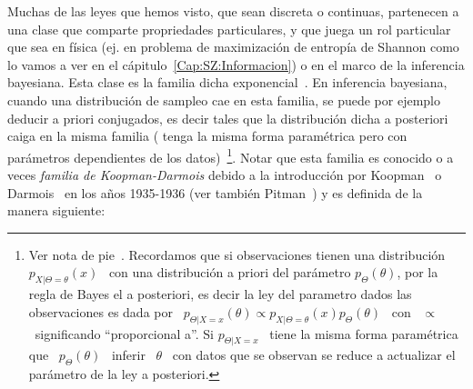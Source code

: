 \label{Ssec:MP:FamiliaExponencial}




Muchas de las leyes que hemos visto, que sean discreta o continuas, partenecen a
una clase que comparte propriedades  particulares, y que juega un rol particular
que sea en f\'isica (ej. en  problema de maximizaci\'on de entrop\'ia de Shannon
como lo vamos a ver en  el c\'apitulo~\ref{Cap:SZ:Informacion}) o en el marco de
la inferencia bayesiana. Esta clase es la familia dicha exponencial~\cite{Dar35,
  Koo36, And70, LehCas98, IbPer12,  Muk00, KotBal00, Rob07, Bos07, Cen82, Kay93,
  NieNoc10}.  En inferencia bayesiana,  cuando una distribuci\'on de sampleo cae
en esta  familia, se  puede por  ejemplo deducir a  priori conjugados,  es decir
tales que  la distribuci\'on dicha a  posteriori caiga en la  misma familia (\ie
tenga la  misma forma  param\'etrica pero con  par\'ametros dependientes  de los
datos)~\footnote{Ver nota de pie~. Recordamos que si
  observaciones tienen  una distribuci\'on \ $p_{X|\Theta=\theta}(x)$  \ con una
  distribuci\'on a  priori del par\'ametro  $p_\Theta(\theta)$, por la  regla de
  Bayes el a  posteriori, es decir la ley del  parametro dados las observaciones
  es   dada  por   \   $p_{\Theta|X=x}(\theta)  \propto   p_{X|\Theta=\theta}(x)
  p_\Theta(\theta)$  \ con  \ $\propto$  \ significando  ``proporcional  a''. Si
  $p_{\Theta|X=x}$ \ tiene la misma forma param\'etrica que \ $p_\Theta(\theta)$
  \ inferir  \ $\theta$ \ con  datos que se  observan se reduce a  actualizar el
  par\'ametro de la  ley a posteriori.}. Notar que esta familia  es conocido o a
veces  {\em   familia  de  Koopman-Darmois}  debido  a   la  introducci\'on  por
Koopman~\cite{Koo36}  o  Darmois~\cite{Dar35}   en  los  a\~nos  1935-1936  (ver
tambi\'en Pitman~\cite{Pit36}) y es definida de la manera siguiente:
%
